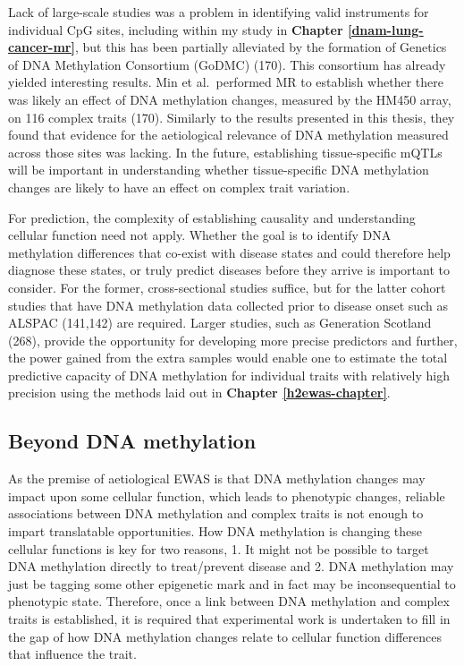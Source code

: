 \documentclass[11pt,twoside]{bristolthesis}
\begin{document}
Lack of large-scale studies was a problem in identifying valid instruments for individual CpG sites, including within my study in \textbf{Chapter \ref{dnam-lung-cancer-mr}}, but this has been partially alleviated by the formation of Genetics of DNA Methylation Consortium (GoDMC) (170). This consortium has already yielded interesting results. Min et al.~performed MR to establish whether there was likely an effect of DNA methylation changes, measured by the HM450 array, on 116 complex traits (170). Similarly to the results presented in this thesis, they found that evidence for the aetiological relevance of DNA methylation measured across those sites was lacking. In the future, establishing tissue-specific mQTLs will be important in understanding whether tissue-specific DNA methylation changes are likely to have an effect on complex trait variation.

For prediction, the complexity of establishing causality and understanding cellular function need not apply. Whether the goal is to identify DNA methylation differences that co-exist with disease states and could therefore help diagnose these states, or truly predict diseases before they arrive is important to consider. For the former, cross-sectional studies suffice, but for the latter cohort studies that have DNA methylation data collected prior to disease onset such as ALSPAC (141,142) are required. Larger studies, such as Generation Scotland (268), provide the opportunity for developing more precise predictors and further, the power gained from the extra samples would enable one to estimate the total predictive capacity of DNA methylation for individual traits with relatively high precision using the methods laid out in \textbf{Chapter \ref{h2ewas-chapter}}.

\hypertarget{beyond-dnam}{%
\subsection{Beyond DNA methylation}\label{beyond-dnam}}

As the premise of aetiological EWAS is that DNA methylation changes may impact upon some cellular function, which leads to phenotypic changes, reliable associations between DNA methylation and complex traits is not enough to impart translatable opportunities. How DNA methylation is changing these cellular functions is key for two reasons, 1. It might not be possible to target DNA methylation directly to treat/prevent disease and 2. DNA methylation may just be tagging some other epigenetic mark and in fact may be inconsequential to phenotypic state. Therefore, once a link between DNA methylation and complex traits is established, it is required that experimental work is undertaken to fill in the gap of how DNA methylation changes relate to cellular function differences that influence the trait.
\end{document}
